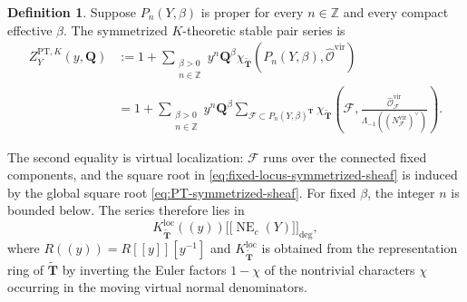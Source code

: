 \documentclass{amsart}
\theoremstyle{definition}
\newtheorem{definition}{Definition}
\numberwithin{equation}{section}
\newcommand{\Z}{\mathbb Z}
\newcommand{\cO}{\mathcal O}
\newcommand{\llbracket}{\mathopen{[\![}}
\newcommand{\rrbracket}{\mathclose{]\!]}}
\begin{document}
\begin{definition}
\label{def:KPT-series}
Suppose \(P_n(Y,\beta)\) is proper for every \(n\in\Z\) and every compact effective \(\beta\).  The symmetrized \(K\)-theoretic stable pair series is
\begin{equation}
\begin{aligned}
 Z_Y^{\mathrm{PT},K}(y,\mathbf Q)
 &:=1+\sum_{\substack{\beta>0\\ n\in\Z}}
 y^n\mathbf Q^\beta
 \chi_{\widetilde{\mathbf T}}\!\left(
 P_n(Y,\beta),\widehat{\cO}^{\mathrm{vir}}\right)\\
 &=1+\sum_{\substack{\beta>0\\ n\in\Z}}
 y^n\mathbf Q^\beta
 \sum_{\mathscr F\subset P_n(Y,\beta)^{\mathbf T}}
 \chi_{\widetilde{\mathbf T}}\left(
 \mathscr F,
 \frac{\widehat{\cO}_{\mathscr F}^{\mathrm{vir}}}
      {\Lambda_{-1}((N_{\mathscr F}^{\mathrm{vir}})^\vee)}
 \right).
\end{aligned}
\label{eq:KPT-series}
\end{equation}
\end{definition}

The second equality is virtual localization: \(\mathscr F\) runs over the connected fixed components, and the square root in \eqref{eq:fixed-locus-symmetrized-sheaf} is induced by the global square root \eqref{eq:PT-symmetrized-sheaf}.  For fixed \(\beta\), the integer \(n\) is bounded below.  The series therefore lies in
\[
 K_{\widetilde{\mathbf T}}^{\mathrm{loc}}((y))
 \llbracket\operatorname{NE}_c(Y)\rrbracket_{\deg},
\]
where \(R((y))=R[[y]][y^{-1}]\) and \(K_{\widetilde{\mathbf T}}^{\mathrm{loc}}\) is obtained from the representation ring of \(\widetilde{\mathbf T}\) by inverting the Euler factors \(1-\chi\) of the nontrivial characters \(\chi\) occurring in the moving virtual normal denominators.
\end{document}
